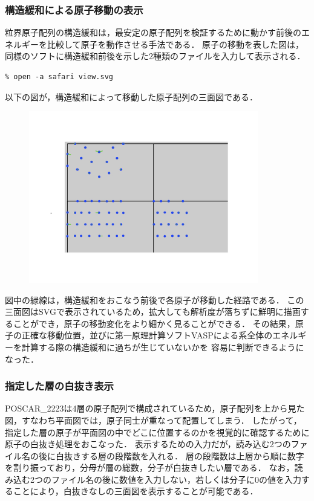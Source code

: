 \subsubsection{構造緩和による原子移動の表示}
粒界原子配列の構造緩和は，最安定の原子配列を検証するために動かす前後のエネルギーを比較して原子を動作させる手法である．
原子の移動を表した図は，同様のソフトに構造緩和前後を示した2種類のファイルを入力して表示される．
\begin{lstlisting}[style=customCsh,basicstyle={\scriptsize\ttfamily}]
% ruby viewer.rb POSCAR_after POSCAR_before
% open -a safari view.svg 
\end{lstlisting}
以下の図が，構造緩和によって移動した原子配列の三面図である．

\begin{figure}[htbp]\begin{center}
\includegraphics[width=10cm,bb= 0 0 737 553]{../figs/./boundary_narita.011.jpeg}
\caption{}
\label{default}\end{center}\end{figure}
図中の緑線は，構造緩和をおこなう前後で各原子が移動した経路である．
この三面図はSVGで表示されているため，拡大しても解析度が落ちずに鮮明に描画することができ，原子の移動変化をより細かく見ることができる．
その結果，原子の正確な移動位置，並びに第一原理計算ソフトVASPによる系全体のエネルギーを計算する際の構造緩和に過ちが生じていないかを
容易に判断できるようになった．

\subsubsection{指定した層の白抜き表示}
POSCAR\_2223は4層の原子配列で構成されているため，原子配列を上から見た図，すなわち平面図では，原子同士が重なって配置してしまう．
したがって，指定した層の原子が平面図の中でどこに位置するのかを視覚的に確認するために原子の白抜き処理をおこなった．
表示するための入力だが，読み込む2つのファイル名の後に白抜きする層の段階数を入れる．
層の段階数は上層から順に数字を割り振っており，分母が層の総数，分子が白抜きしたい層である．
なお，読み込む2つのファイル名の後に数値を入力しない，若しくは分子に0の値を入力することにより，白抜きなしの三面図を表示することが可能である．

